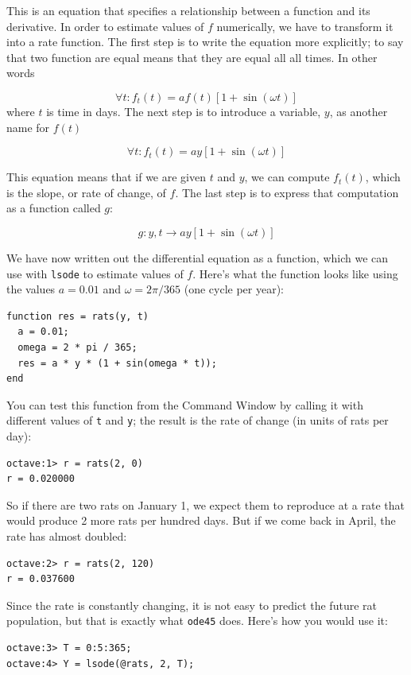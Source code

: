 This is an equation that specifies a relationship between a
function and its derivative. In order to estimate values of
$f$ numerically, we have to transform it into a rate function.
The first step is to write the equation more explicitly; to
say that two function are equal means that they are equal
all all times. In other words

\[ \forall t: f_t(t) = a f(t) \left[1 + \sin (\omega t) \right] \]
%
where $t$ is time in days. The next step is to introduce a variable,
$y$, as another name for $f(t)$

\[ \forall t: f_t(t) = a y \left[1 + \sin (\omega t) \right] \]

This equation means that if we are given $t$ and $y$, we can
compute $f_t(t)$, which is the slope, or rate of change, of $f$.
The last step is to express that computation as a function called
$g$:

\[ g : y, t \to a y \left[1 + \sin (\omega t) \right] \]

We have now written out the differential equation as a function, which we
can use with {\tt lsode} to estimate values of $f$. Here's
what the function looks like using the values $a = 0.01$
and $\omega = 2 \pi/365$ (one cycle per year):

\begin{verbatim}
function res = rats(y, t)
  a = 0.01;
  omega = 2 * pi / 365;
  res = a * y * (1 + sin(omega * t));
end
\end{verbatim}

You can test this function from the Command Window by calling it with
different values of {\tt t} and {\tt y}; the result is the rate of
change (in units of rats per day):

\begin{verbatim}
octave:1> r = rats(2, 0)
r = 0.020000
\end{verbatim}

So if there are two rats on January 1, we expect them to reproduce
at a rate that would produce 2 more rats per hundred days. But
if we come back in April, the rate has almost doubled:

\begin{verbatim}
octave:2> r = rats(2, 120)
r = 0.037600
\end{verbatim}

Since the rate is constantly changing, it is not easy to predict
the future rat population, but that is exactly what {\tt ode45} does.
Here's how you would use it:

\begin{verbatim}
octave:3> T = 0:5:365;
octave:4> Y = lsode(@rats, 2, T);
\end{verbatim}

